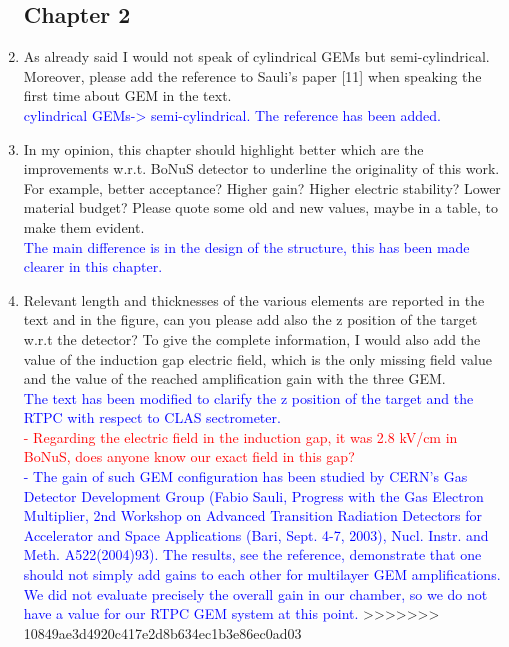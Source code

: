 \documentclass[a4paper,11pt,twoside]{article}
\begin{document}
\begin{enumerate}

\subsection*{Chapter 2}
\item As already said I would not speak of cylindrical GEMs but 
   semi-cylindrical. Moreover, please add the reference to Sauli's paper [11] 
   when speaking the first time about GEM in the text.\\
\textcolor{blue}{cylindrical GEMs-> semi-cylindrical. The reference has been added.} 

\item In my opinion, this chapter should highlight better which are the 
   improvements w.r.t. BoNuS detector to underline the originality of this 
   work. For example, better acceptance? Higher gain? Higher electric 
   stability? Lower material budget? Please quote some old and new values, 
   maybe in a table, to make them evident.\\
\textcolor{blue}{The main difference is in the design of the structure, this has 
been made clearer in this chapter.} 

\item Relevant length and thicknesses of the various elements are reported in 
   the text and in the figure, can you please add also the z position of the 
   target w.r.t the detector? To give the complete information, I would also 
   add the value of the induction gap electric field, which is the only missing 
   field value and the value of the reached amplification gain with the three 
   GEM.\\
\textcolor{blue}{ The text has been modified to clarify the z position of the 
target and the RTPC with respect to CLAS sectrometer.\\}
\textcolor{red}{- Regarding the electric field in the induction gap, it was 2.8 
kV/cm in BoNuS, does anyone know our exact field in this gap?\\}
\textcolor{blue}{- The gain of such GEM configuration has been studied by 
   CERN's Gas Detector Development Group (Fabio Sauli, Progress with the Gas 
   Electron Multiplier, 2nd Workshop on Advanced Transition Radiation Detectors 
   for Accelerator and Space Applications (Bari, Sept. 4-7, 2003), Nucl. Instr. 
   and Meth. A522(2004)93). The results, see the reference, demonstrate that 
one should not simply add gains to each other for multilayer GEM 
amplifications.  We did not evaluate precisely the overall gain in our chamber, 
so we do not have a value for our RTPC GEM system at this point.}
>>>>>>> 10849ae3d4920c417e2d8b634ec1b3e86ec0ad03


\end{enumerate}
\end{document}
